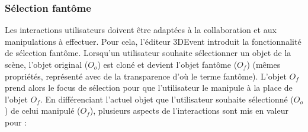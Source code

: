 \subsubsection{Sélection fantôme}
Les interactions utilisateurs doivent être adaptées à la collaboration et aux 
manipulations à effectuer. Pour cela, l'éditeur 3DEvent introduit la fonctionnalité de 
sélection \og fantôme\fg{}. Lorsqu'un utilisateur souhaite sélectionner un objet de 
la scène, l'objet original ($O_o$) est 
cloné et devient l'objet fantôme ($O_f$) (mêmes propriétés, représenté avec de la 
transparence d'où le terme \og fantôme\fg{}). 
L'objet $O_f$ prend alors le focus de sélection pour que l'utilisateur le manipule à 
la place de l'objet $O_f$. 
En différenciant l'actuel objet que l'utilisateur souhaite sélectionné ($O_{o}$) de 
celui manipulé ($O_f$), plusieurs aspects de l'interactions sont mis en valeur pour :
